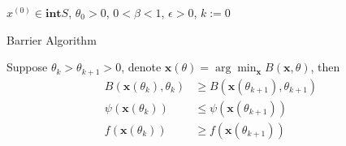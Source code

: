 \begin{algorithm}[H]
    \SetAlgoLined
     $x^{(0)} \in \mathbf{int}S$, $\theta_0 > 0$,
     $0 < \beta < 1$, $\epsilon > 0$, $k:= 0$\;
     \caption{Barrier Algorithm}
\end{algorithm}

\begin{theorem}
    Suppose $\theta_k > \theta_{k+1} > 0$,
    denote $\mathbf{x}(\theta) = \arg\min_{\mathbf{x}}
    B(\mathbf{x}, \theta)$, then
    \begin{align}
        B(\mathbf{x}(\theta_k), \theta_k)
        &\geq B(\mathbf{x}(\theta_{k+1}), \theta_{k+1}) \\
        \psi(\mathbf{x}(\theta_k)) &\leq
        \psi(\mathbf{x}(\theta_{k+1})) \\
        f(\mathbf{x}(\theta_k)) &\geq
        f(\mathbf{x}(\theta_{k+1}))
    \end{align}
\end{theorem}
